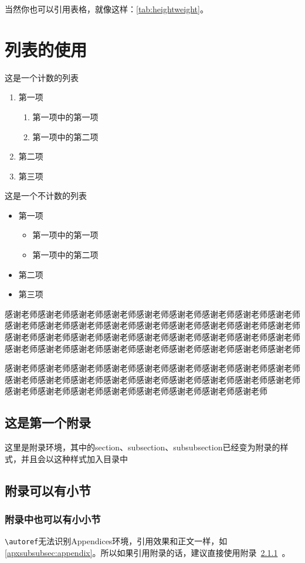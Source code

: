 \documentclass[supercite,gbtcite]{HustGraduPaper}
\begin{document}
	当然你也可以引用表格，就像这样：\autoref{tab:heightweight}。
	
	\section{列表的使用}
	这是一个计数的列表
	\begin{enumerate}
		\item 第一项
			\begin{enumerate}
				\item 第一项中的第一项
				\item 第一项中的第二项
			\end{enumerate}
		\item 第二项
		\item 第三项
	\end{enumerate}

	这是一个不计数的列表
	\begin{itemize}
		\item 第一项
		\begin{itemize}
			\item 第一项中的第一项
			\item 第一项中的第二项
		\end{itemize}
		\item 第二项
		\item 第三项
	\end{itemize}
	
	\begin{thankpage}
		感谢老师感谢老师感谢老师感谢老师感谢老师感谢老师感谢老师感谢老师感谢老师感谢老师感谢老师感谢老师感谢老师感谢老师感谢老师感谢老师感谢老师感谢老师感谢老师感谢老师感谢老师感谢老师感谢老师感谢老师感谢老师感谢老师感谢老师感谢老师感谢老师感谢老师感谢老师感谢老师感谢老师感谢老师感谢老师感谢老师
		
		感谢老师感谢老师感谢老师感谢老师感谢老师感谢老师感谢老师感谢老师感谢老师感谢老师感谢老师感谢老师感谢老师感谢老师感谢老师感谢老师感谢老师感谢老师感谢老师感谢老师感谢老师感谢老师感谢老师感谢老师感谢老师感谢老师
	\end{thankpage}
	
	
	
	\begin{appendices}
		\section{这是第一个附录}
		这里是附录环境，其中的section、subsection、subsubsection已经变为附录的样式，并且会以这种样式加入目录中
		\subsection{附录可以有小节}
		\subsubsection{附录中也可以有小小节}\label{apxsubsubsec:appendix}
		\verb|\autoref|无法识别Appendices环境，引用效果和正文一样，如\autoref{apxsubsubsec:appendix}。所以如果引用附录的话，建议直接使用附录~\ref{apxsubsubsec:appendix}~。
	\end{appendices}
	
\end{document}

